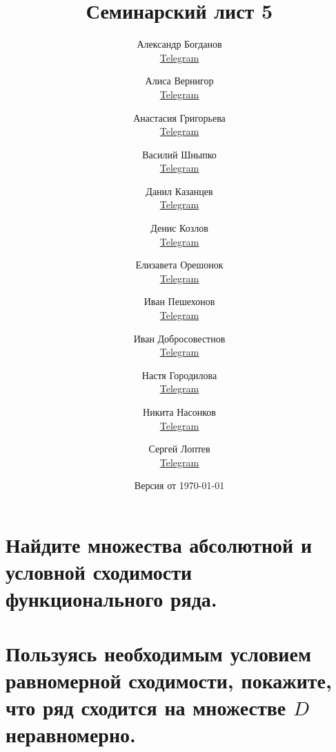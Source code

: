 \documentclass[a4paper, fleqn]{article}
\title{Семинарский лист 5}
\author{
    Александр Богданов   \\ \href{https://t.me/SphericalPotatoInVacuum}{Telegram} \and
    Алиса Вернигор       \\ \href{https://t.me/allisyonok}{Telegram} \and
    Анастасия Григорьева \\ \href{https://t.me/weifoll}{Telegram} \and
    Василий Шныпко       \\ \href{https://t.me/yourvash}{Telegram} \and
    Данил Казанцев       \\ \href{https://t.me/vserosbuybuy}{Telegram} \and
    Денис Козлов         \\ \href{https://t.me/DKozl50}{Telegram} \and
    Елизавета Орешонок   \\ \href{https://t.me/eaoresh}{Telegram} \and
    Иван Пешехонов       \\ \href{https://t.me/JohanDDC}{Telegram} \and
    Иван Добросовестнов  \\ \href{https://t.me/ivankot13}{Telegram} \and
    Настя Городилова     \\ \href{https://t.me/nastygorodi}{Telegram} \and
    Никита Насонков      \\ \href{https://t.me/nnv_nick}{Telegram} \and
    Сергей Лоптев        \\ \href{https://t.me/beast_sl}{Telegram}
}
\date{Версия от {\ddmmyyyydate\today} \currenttime}
\begin{document}
    \maketitle
    
    \section*{Найдите множества абсолютной и условной сходимости функционального ряда.}
    
    
    
    
    
    
    \section*{Пользуясь необходимым условием равномерной сходимости, покажите, что ряд сходится на множестве $D$
        неравномерно.}
    
    
\end{document}
